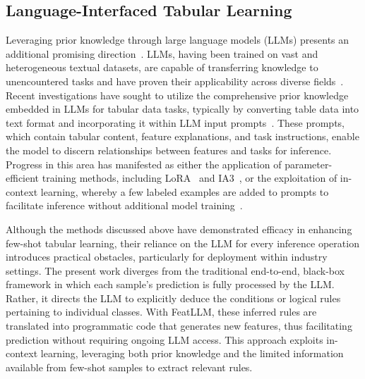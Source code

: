 \subsection{Language-Interfaced Tabular Learning} Leveraging prior knowledge through large language models (LLMs) presents an additional promising direction~\cite{anil2023palm,openai2023gpt4}. LLMs, having been trained on vast and heterogeneous textual datasets, are capable of transferring knowledge to unencountered tasks and have proven their applicability across diverse fields~\cite{brown2020language}. Recent investigations have sought to utilize the comprehensive prior knowledge embedded in LLMs for tabular data tasks, typically by converting table data into text format and incorporating it within LLM input prompts~\cite{dinh2022lift,hegselmann2023tabllm,wang2023anypredict}. These prompts, which contain tabular content, feature explanations, and task instructions, enable the model to discern relationships between features and tasks for inference. Progress in this area has manifested as either the application of parameter-efficient training methods, including LoRA~\cite{hu2021lora} and IA3~\cite{liu2022few}, or the exploitation of in-context learning, whereby a few labeled examples are added to prompts to facilitate inference without additional model training~\cite{dinh2022lift,hegselmann2023tabllm,nam2023semi,slack2023tablet}.

Although the methods discussed above have demonstrated efficacy in enhancing few-shot tabular learning, their reliance on the LLM for every inference operation introduces practical obstacles, particularly for deployment within industry settings. The present work diverges from the traditional end-to-end, black-box framework in which each sample's prediction is fully processed by the LLM. Rather, it directs the LLM to explicitly deduce the conditions or logical rules pertaining to individual classes. With \textsf{FeatLLM}, these inferred rules are translated into programmatic code that generates new features, thus facilitating prediction without requiring ongoing LLM access. This approach exploits in-context learning, leveraging both prior knowledge and the limited information available from few-shot samples to extract relevant rules.

